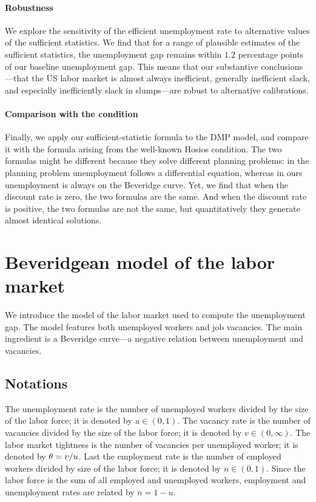 \documentclass[letterpaper,12pt,leqno]{article}
\begin{document}
\paragraph{Robustness} We explore the sensitivity of the efficient unemployment rate to alternative values of the sufficient statistics. We find that for a range of plausible estimates of the sufficient statistics, the unemployment gap remains within $1.2$ percentage points of our baseline unemployment gap. This means that our substantive conclusions---that the US labor market is almost always inefficient, generally inefficient slack, and especially inefficiently slack in slumps---are robust to alternative calibrations.

\paragraph{Comparison with the  condition} Finally, we apply our sufficient-statistic formula to the DMP model, and compare it with the formula arising from the well-known Hosios condition. The two formulas might be different because they solve different planning problems: in the  planning problem unemployment follows a differential equation, whereas in ours unemployment is always on the Beveridge curve. Yet, we find that when the discount rate is zero, the two formulas are the same. And when the discount rate is positive, the two formulas are not the same, but quantitatively they generate almost identical solutions.

\section{Beveridgean model of the labor market}\label{s:model}

We introduce the model of the labor market used to compute the unemployment gap. The model features both unemployed workers and job vacancies. The main ingredient is a Beveridge curve---a negative relation between unemployment and vacancies.

\subsection{Notations}

The unemployment rate is the number of unemployed workers divided by the size of the labor force; it is denoted by $u \in (0,1)$. The vacancy rate is the number of vacancies divided by the size of the labor force; it is denoted by $v\in (0,\infty)$. The labor market tightness is the number of vacancies per unemployed worker; it is denoted by $\theta = v/u$. Last the employment rate is the number of employed workers divided by size of the labor force; it is denoted by $n\in (0,1)$. Since the labor force is the sum of all employed and unemployed workers, employment and unemployment rates are related by $n=1-u$.
\end{document}
